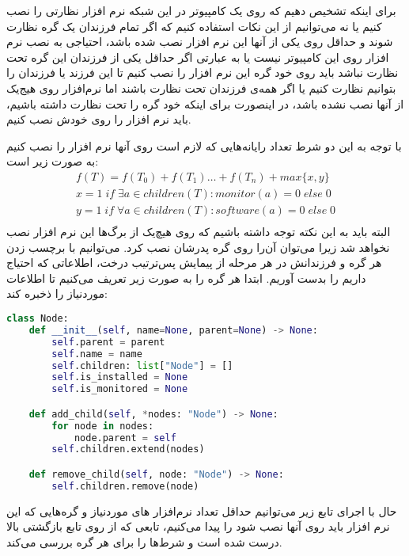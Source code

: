 \documentclass[]{article}
\begin{document}
برای اینکه تشخیص دهیم که روی یک کامپیوتر در این شبکه نرم افزار نظارتی را نصب کنیم یا نه
می‌توانیم از این نکات استفاده کنیم که اگر تمام فرزندان یک گره نظارت شوند و حداقل روی یکی از آنها
این نرم افزار نصب شده باشد، احتیاجی به نصب نرم افزار روی این کامپیوتر نیست یا
به عبارتی اگر حداقل یکی از فرزندان این گره تحت نظارت نباشد باید روی خود گره این نرم افزار را نصب کنیم
تا این فرزند یا فرزندان را بتوانیم نظارت کنیم یا اگر 
همه‌ی فرزندان تحت نظارت باشند اما نرم‌افزار روی هیج‌یک از آنها نصب نشده باشد،
در اینصورت برای اینکه خود گره را تحت نظارت داشته باشیم، باید نرم افزار را روی خودش نصب کنیم.

با توجه به این دو شرط تعداد رایانه‌هایی که لازم است روی آنها نرم افزار را نصب کنیم به صورت زیر است:
\begin{align}
    f(T) = f(T_{0}) + f(T_{1}) \ldots + f(T_{n}) + max\lbrace x, y \rbrace\\
    x = 1 \; if \; \exists a \in children(T) : monitor(a) = 0 \; else \; 0\\
    y = 1 \; if \; \forall a \in children(T) : software(a) = 0 \; else \; 0\\
\end{align}
البته باید به این نکته توجه داشته باشیم که روی هیچ‌یک از برگ‌ها این نرم افزار نصب نخواهد شد زیرا می‌توان
آن‌را روی گره‌ پدرشان نصب کرد.
می‌توانیم با برچسب زدن هر گره و فرزندانش در هر مرحله از پیمایش پس‌ترتیب درخت، اطلاعاتی که احتیاج داریم را بدست آوریم.
ابتدا هر گره را به صورت زیر تعریف می‌کنیم تا اطلاعات موردنیاز را ذخبره کند:
\begin{latin}
\begin{lstlisting}[language=python]
class Node:
    def __init__(self, name=None, parent=None) -> None:
        self.parent = parent
        self.name = name
        self.children: list["Node"] = []
        self.is_installed = None
        self.is_monitored = None

    def add_child(self, *nodes: "Node") -> None:
        for node in nodes:
            node.parent = self
        self.children.extend(nodes)

    def remove_child(self, node: "Node") -> None:
        self.children.remove(node)
\end{lstlisting}
\end{latin}
حال با اجرای تابع زیر می‌توانیم حداقل تعداد نرم‌افزار های موردنیاز و گره‌هایی که این نرم افزار
باید روی آنها نصب شود را پیدا می‌کنیم، تابعی که از روی تابع بازگشتی بالا درست شده است و شرط‌ها را
برای هر گره بررسی می‌کند.
\end{document}

